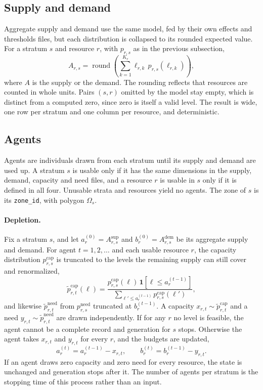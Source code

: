 \subsection{Supply and demand}

Aggregate supply and demand use the same model, fed by their own effects and thresholds
files, but each distribution is collapsed to its rounded expected value. For a stratum $s$
and resource $r$, with $p_{r,s}$ as in the previous subsection,
\begin{equation}
  A_{r,s} = \operatorname{round}\left(\sum_{k=1}^{K_r} \ell_{r,k} \, p_{r,s}(\ell_{r,k})\right),
\end{equation}
where $A$ is the supply or the demand. The rounding reflects that resources are counted in
whole units. Pairs $(s, r)$ omitted by the model stay empty, which is distinct from a
computed zero, since zero is itself a valid level. The result is wide, one row per stratum
and one column per resource, and deterministic.

\subsection{Agents}

Agents are individuals drawn from each stratum until its supply and demand are used up. A
stratum $s$ is usable only if it has the same dimensions in the supply, demand, capacity and
need files, and a resource $r$ is usable in $s$ only if it is defined in all four. Unusable
strata and resources yield no agents. The zone of $s$ is its \texttt{zone\_id}, with polygon
$\Omega_s$.

\paragraph{Depletion.}
Fix a stratum $s$, and let $a_r^{(0)} = A^{\mathrm{sup}}_{r,s}$ and
$b_r^{(0)} = A^{\mathrm{dem}}_{r,s}$ be its aggregate supply and demand. For agent
$t = 1, 2, \dots$ and each usable resource $r$, the capacity distribution
$p^{\mathrm{cap}}_{r,s}$ is truncated to the levels the remaining supply can still cover
and renormalized,
\begin{equation}
  \tilde p^{\mathrm{cap}}_{r,t}(\ell) =
  \frac{p^{\mathrm{cap}}_{r,s}(\ell) \, \mathbf{1}\left[\ell \le a_r^{(t-1)}\right]}
       {\sum_{\ell' \le a_r^{(t-1)}} p^{\mathrm{cap}}_{r,s}(\ell')},
\end{equation}
and likewise $\tilde p^{\mathrm{need}}_{r,t}$ from $p^{\mathrm{need}}_{r,s}$ truncated at
$b_r^{(t-1)}$. A capacity $x_{r,t} \sim \tilde p^{\mathrm{cap}}_{r,t}$ and a need
$y_{r,t} \sim \tilde p^{\mathrm{need}}_{r,t}$ are drawn independently. If for any $r$ no
level is feasible, the agent cannot be a complete record and generation for $s$ stops.
Otherwise the agent takes $x_{r,t}$ and $y_{r,t}$ for every $r$, and the budgets are
updated,
\begin{equation}
  a_r^{(t)} = a_r^{(t-1)} - x_{r,t}, \qquad b_r^{(t)} = b_r^{(t-1)} - y_{r,t}.
\end{equation}
If an agent draws zero capacity and zero need for every resource, the state is unchanged
and generation stops after it. The number of agents per stratum is the stopping time of
this process rather than an input.

